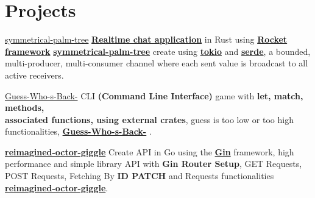 \documentclass[]{deedy-resume-openfont}
\begin{document}
\begin{minipage}[t]{0.66\textwidth}
\sectionsep


\section{Projects}
\descript{| }
{\href{https://github.com/tusharxoxoxo/symmetrical-palm-tree}{symmetrical-palm-tree}}
\href{https://www.youtube.com/watch?v=7U-vRudcI1Y}{\textbf{Realtime chat application}} in Rust using {\href{https://github.com/SergioBenitez/Rocket}{\textbf{Rocket framework}}}  \textbf{\href{https://github.com/tusharxoxoxo/symmetrical-palm-tree}{symmetrical-palm-tree}} create using \href{https://github.com/tokio-rs/tokio}{\textbf{tokio}} and \href{https://github.com/serde-rs/serde}{\textbf{serde}}, a bounded, multi-producer, multi-consumer channel where each sent value is broadcast to all active receivers. 
\sectionsep

\descript{| }
{\href{https://github.com/tusharxoxoxo/Guess-Who-s-Back-}{Guess-Who-s-Back-}}
CLI {\textbf{(Command Line Interface)}} game with \textbf{let, match, methods, \\associated functions, using external crates}, guess is too low or too high functionalities, \textbf{\href{https://github.com/tusharxoxoxo/Guess-Who-s-Back-}{Guess-Who-s-Back-}} . 
\sectionsep

\descript{| }
\textbf{\href{https://github.com/tusharxoxoxo/reimagined-octo-giggle/}{reimagined-octor-giggle}}
Create API in Go using the \href{https://github.com/gin-gonic/gin}{\textbf{Gin}} framework, high performance and simple library API with {\textbf{Gin Router Setup}}, GET Requests,
POST Requests, Fetching By {\textbf{ID PATCH}} and Requests functionalities \textbf{\href{https://github.com/tusharxoxoxo/reimagined-octo-giggle/}{reimagined-octor-giggle}}. 
\sectionsep


\end{minipage}
\end{document}
